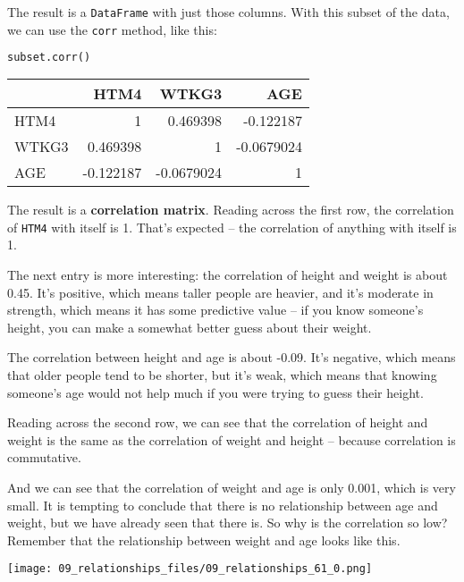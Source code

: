 The result is a \passthrough{\lstinline!DataFrame!} with just those
columns. With this subset of the data, we can use the
\passthrough{\lstinline!corr!} method, like this:

\begin{lstlisting}[language=Python,style=source]
subset.corr()
\end{lstlisting}

\begin{tabular}{lrrr}
\toprule
 & HTM4 & WTKG3 & AGE \\
\midrule
HTM4 & 1 & 0.469398 & -0.122187 \\
WTKG3 & 0.469398 & 1 & -0.0679024 \\
AGE & -0.122187 & -0.0679024 & 1 \\
\bottomrule
\end{tabular}

The result is a \textbf{correlation matrix}. Reading across the first
row, the correlation of \passthrough{\lstinline!HTM4!} with itself is 1.
That's expected -- the correlation of anything with itself is 1.

The next entry is more interesting: the correlation of height and weight
is about 0.45. It's positive, which means taller people are heavier, and
it's moderate in strength, which means it has some predictive value --
if you know someone's height, you can make a somewhat better guess about
their weight.

The correlation between height and age is about -0.09. It's negative,
which means that older people tend to be shorter, but it's weak, which
means that knowing someone's age would not help much if you were trying
to guess their height.

Reading across the second row, we can see that the correlation of height
and weight is the same as the correlation of weight and height --
because correlation is commutative.

And we can see that the correlation of weight and age is only 0.001,
which is very small. It is tempting to conclude that there is no
relationship between age and weight, but we have already seen that there
is. So why is the correlation so low? Remember that the relationship
between weight and age looks like this.



\begin{center}
\texttt{[image: 09\_relationships\_files/09\_relationships\_61\_0.png]}
\end{center}

